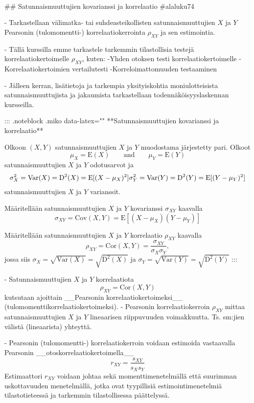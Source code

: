 \documentclass[
]{book}
\begin{document}
\begin{itemize}
\
\

## Satunnaismuuttujien kovarianssi ja korrelaatio {#alaluku74}

- Tarkastellaan välimatka- tai suhdeasteikollisten satunnaismuuttujien $X$ ja $Y$ Pearsonin (tulomomentti-) korrelaatiokerrointa $\rho_{XY}$ ja sen estimointia.

- Tällä kurssilla emme tarkastele tarkemmin tilastollisia testejä korrelaatiokertoimelle $\rho_{XY}$, kuten:
  -Yhden otoksen testi korrelaatiokertoimelle
  -Korrelaatiokertoimien vertailutesti
  -Korreloimattomuuden testaaminen

- Jälleen kerran, lisätietoja ja tarkempia yksityiskohtia moniulotteisista satunnaismuuttujista ja jakaumista tarkastellaan todennäköisyyslaskennan kursseilla.

::: {.noteblock .miko data-latex="{}"}
**Satunnaismuuttujien kovarianssi ja korrelaatio**  

 Olkoon $(X, Y)$ satunnaismuuttujien $X$ ja $Y$ muodostama järjestetty pari. Olkoot 
$$
    \mu_X = \text{E}(X) \qquad \mathrm{and} \qquad  \mu_Y = \text{E}(Y)
$$
satunnaismuuttujien $X$ ja $Y$ odotusarvot ja
$$
   \sigma^2_X = \mathrm{Var}(X) = \text{D}^2(X) = \text{E}[(X- \mu_X)^2] \\
   \sigma^2_Y = \mathrm{Var}(Y) = \text{D}^2(Y) = \text{E}[(Y- \mu_Y)^2]
$$
satunnaismuuttujien $X$ ja $Y$ varianssit. 
\

Määritellään satunnaismuuttujien $X$ ja $Y$ kovarianssi $\sigma_{XY}$ kaavalla
$$
\sigma_{XY} = \mathrm{Cov}(X,Y) = \text{E}[(X-\mu_X)(Y-\mu_Y)]
$$

Määritellään satunnaismuuttujien $X$ ja $Y$ korrelaatio $\rho_{XY}$ kaavalla
$$
\rho_{XY} = \mathrm{Cor}(X,Y) = \frac{\sigma_{XY}}{\sigma_{X} \sigma_{Y}},
$$
jossa siis $\sigma_X = \sqrt{\mathrm{Var}(X)} = \sqrt{\text{D}^2(X)}$ ja $\sigma_Y = \sqrt{\mathrm{Var}(Y)} = \sqrt{\text{D}^2(Y)}$
:::

- Satunnaismuuttujien $X$ ja $Y$ korrelaatiota
$$
\rho_{XY} = \mathrm{Cor}(X, Y)
$$
kutsutaan ajoittain __Pearsonin korrelaatiokertoimeksi__ (tulomomenttikorrelaatiokertoimeksi).
  - Pearsonin korrelaatiokerroin $\rho_{XY}$ mittaa satunnaismuuttujien $X$ ja $Y$ lineaarisen riippuvuuden voimakkuutta. Ts. sm:jien välistä (lineaarista) yhteyttä.

- Pearsonin (tulomomentti-) korrelaatiokerroin voidaan estimoida vastaavalla Pearsonin __otoskorrelaatiokertoimella__ 
$$
r_{XY} = \frac{s_{XY}}{s_X s_Y}
$$
Estimaattori $r_{XY}$ voidaan johtaa sekä momenttimenetelmällä että suurimman uskottavuuden menetelmällä, jotka ovat tyypillisiä estimointimenetelmiä tilastotieteessä ja tarkemmin tilastollisessa päättelyssä.


\end{itemize}
\end{document}
